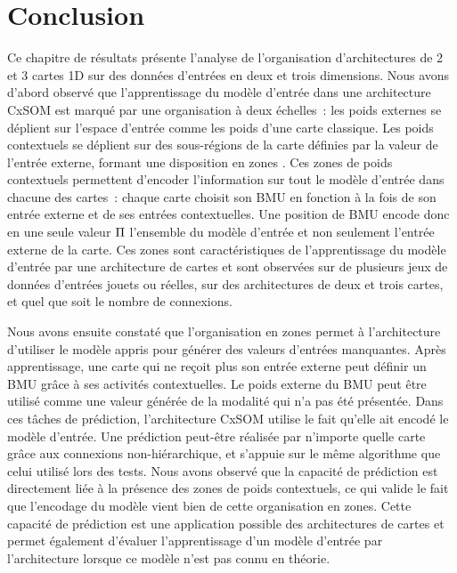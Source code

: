 \documentclass[../main]{subfiles}
\begin{document}
\section{Conclusion}

Ce chapitre de résultats présente l'analyse de l'organisation d'architectures de 2 et 3 cartes 1D sur des données d'entrées en deux et trois dimensions.
Nous avons d'abord observé que l'apprentissage du modèle d'entrée dans une architecture CxSOM est marqué par une organisation à deux échelles~: les poids externes se déplient sur l'espace d'entrée comme les poids d'une carte classique. Les poids contextuels se déplient sur des sous-régions de la carte définies par la valeur de l'entrée externe, formant une disposition en \og zones \fg{}.
Ces zones de poids contextuels permettent d'encoder l'information sur tout le modèle d'entrée dans chacune des cartes~: 
chaque carte choisit son BMU en fonction à la fois de son entrée externe et de ses entrées contextuelles. Une position de BMU encode donc en une seule valeur $\Pi$ l'ensemble du modèle d'entrée et non seulement l'entrée externe de la carte.
Ces zones sont caractéristiques de l'apprentissage du modèle d'entrée par une architecture de cartes et sont observées sur de plusieurs jeux de données d'entrées jouets ou réelles, sur des architectures de deux et trois cartes, et quel que soit le nombre de connexions.

Nous avons ensuite constaté que l'organisation en zones permet à l'architecture d'utiliser le modèle appris pour générer des valeurs d'entrées manquantes.
Après apprentissage, une carte qui ne reçoit plus son entrée externe peut définir un BMU grâce à ses activités contextuelles.
Le poids externe du BMU peut être utilisé comme une valeur générée de la modalité qui n'a pas été présentée.
Dans ces tâches de prédiction, l'architecture CxSOM utilise le fait qu'elle ait encodé le modèle d'entrée. Une prédiction peut-être réalisée par n'importe quelle carte grâce aux connexions non-hiérarchique, et s'appuie sur le même algorithme que celui utilisé lors des tests.
Nous avons observé que la capacité de prédiction est directement liée à la présence des zones de poids contextuels, ce qui valide le fait que l'encodage du modèle vient bien de cette organisation en zones.
Cette capacité de prédiction est une application possible des architectures de cartes et permet également d'évaluer l'apprentissage d'un modèle d'entrée par l'architecture lorsque ce modèle n'est pas connu en théorie.
\end{document}
